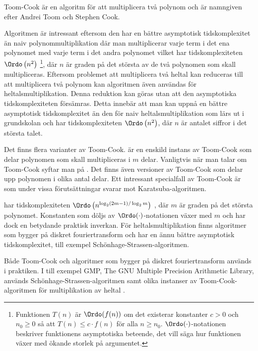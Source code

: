 Toom-Cook är en algoritm för att multiplicera två polynom och är namngiven efter
Andrei Toom och Stephen Cook.

Algoritmen är intressant eftersom den har en bättre asymptotisk tidskomplexitet
än naiv polynommultiplikation där man multiplicerar varje term i det ena
polynomet med varje term i det andra polynomet vilket har tidskomplexiteten
$\Ordo\left(n^2\right)$ \footnote{Funktionen $T(n)$ är $\Ordo(f(n))$ om det existerar
konstanter $c > 0$ och $n_0 \geq 0$ så att $T(n) \leq c \cdot f(n)$ för alla $n
\geq n_0$. $\Ordo(\cdot )$-notationen beskriver funktionens asymptotiska beteende,
det vill säga hur funktionen växer med ökande storlek på argumentet.}, där $n$
är graden på det största av de två polynomen som skall multipliceras. Eftersom
problemet att multiplicera två heltal kan reduceras till att multiplicera två
polynom kan algoritmen även användas för heltalsmultiplikation. Denna reduktion
kan göras utan att den asymptotiska tidskomplexiteten försämras. Detta innebär
att man kan uppnå en bättre asymptotisk tidskomplexitet än den för naiv
heltalsmultiplikation som lärs ut i grundskolan och har tidskomplexiteten
$\Ordo\left(n^2\right)$, där $n$ är antalet siffror i det största talet.

Det finns flera varianter av Toom-Cook.  är en enskild instans av
Toom-Cook som delar polynomen som skall multipliceras i $m$ delar. Vanligtvis när
man talar om Toom-Cook syftar man på . Det finns även versioner av
Toom-Cook som delar upp polynomen i olika antal delar. Ett intressant specialfall
av Toom-Cook är  som under vissa förutsättningar svarar mot
Karatsuba-algoritmen.

 har tidskomplexiteten $\Ordo \left(n^{\log_2(2 m-1)/\log_2 m}\right)$
\cite{bodrato2007towards}, där $m$ är graden på det största polynomet.
Konstanten som döljs av $\Ordo(\cdot)$-notationen växer med $m$ och har dock en
betydande praktisk inverkan. För heltalsmultiplikation finns algoritmer som
bygger på diskret fouriertransform och har en ännu bättre asymptotisk
tidskomplexitet, till exempel Schönhage-Strassen-algoritmen.

Både Toom-Cook och algoritmer som bygger på diskret fouriertransform används i
praktiken. I till exempel GMP, The GNU Multiple Precision Arithmetic Library,
används Schönhage-Strassen-algoritmen samt olika instanser av
Toom-Cook-algoritmen för multiplikation av heltal \cite{gmpdoc}.
